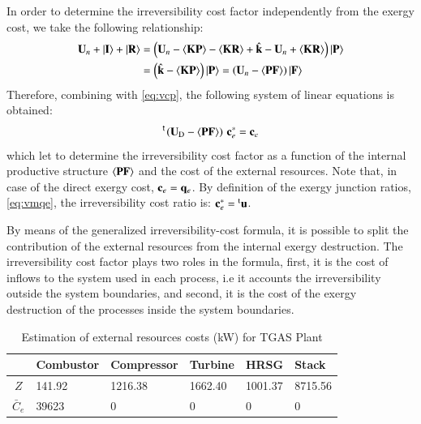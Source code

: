 \documentclass{ecos2018}
\begin{document}
In order to determine the irreversibility cost factor independently from the exergy cost, we take the following relationship:
\begin{equation}
\begin{split}
\mathbf{U}_n+\left| {\textbf{I} } \right\rangle+\left| {\textbf{R} } \right\rangle&=\left(\mathbf{U}_n-\langle \textbf{KP} \rangle-\langle \textbf{KR} \rangle+\hat{\mathbf{k}}-\mathbf{U}_n+\langle \textbf{KR} \rangle\right)\left| {\textbf{P} } \right\rangle\\
&=\left(\hat{\mathbf{k}}-\langle \textbf{KP} \rangle\right)\left| {\textbf{P} } \right\rangle=\left(\mathbf{U}_n-\langle \textbf{PF} \rangle\right)\left| {\textbf{F} } \right\rangle
\end{split}
\end{equation}
Therefore, combining with \cref{eq:vcp}, the following system of linear equations is obtained:
\begin{equation}
\prescript{\smash{\mathsf{t}}}{}{\mskip-1mu}\left(\mathbf{U}_\mathrm{D}-\langle \textbf{PF} \rangle\right)\,\mathbf{c}_{e}^{*}=\mathbf{c}_{e}
\end{equation}
which let to determine the irreversibility cost factor as a function of the internal productive structure $\langle \textbf{PF} \rangle$ and the cost of the external resources. Note that, in case of the direct exergy cost, $\mathbf{c}_e = \mathbf{q}_e$.  By definition of the exergy junction ratios, \cref{eq:vmqe}, the irreversibility cost ratio is: $\mathbf{c}_{e}^{*}=\prescript{\smash{\mathrm{t}}}{}{\mathbf{u}}$.

By means of the generalized irreversibility-cost formula, it is possible to split the contribution of the external resources from the internal exergy destruction. The irreversibility cost factor plays two roles in the formula, first, it is the cost of inflows to the system used in each process, i.e it accounts the irreversibility outside the system boundaries, and second, it is the cost of the exergy destruction of the processes inside the system boundaries.

\begin{table}[htbp]
	\caption{Estimation of external resources costs (kW) for TGAS Plant}
	\begin{tabularx}{0.8\textwidth}{cZZZZZ}
		\toprule
		& Combustor & Compressor & Turbine & HRSG  & Stack \\
		\midrule
		$Z$          &   141.92 & 1216.38 & 1662.40 & 1001.37 & 8715.56 \\
		$\bar{C}_e$  &    39623 & 0 & 0 & 0 & 0 \\
		\bottomrule
	\end{tabularx}%
	\label{tab4}%
\end{table}%
\end{document}
